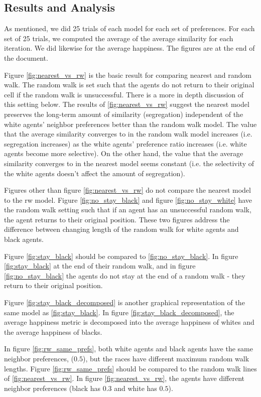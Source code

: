 \documentclass[11pt,twoside]{amsart}
\theoremstyle{theorem}
\theoremstyle{definition}
\theoremstyle{remark}
\begin{document}
\subsection{Results and Analysis}
As mentioned, we did 25 trials of each model for each set of preferences. 
For each set of 25 trials, we computed the average of the average similarity for each iteration. 
We did likewise for the average happiness. 
The figures are at the end of the document.

Figure \ref{fig:nearest_vs_rw} is the basic result for comparing nearest and random walk.
The random walk is set such that the agents do not return to their original cell if the random walk is unsuccessful. 
There is a more in depth discussion of this setting below. 
The results of \ref{fig:nearest_vs_rw} suggest the nearest model preserves the long-term amount of similarity (segregation) independent of the white agents' neighbor preferences better than the random walk model. 
The value that the average similarity converges to in the random walk model increases (i.e. segregation increases) as the white agents' preference ratio increases (i.e. white agents become more selective).
On the other hand, the value that the average similarity converges to in the nearest model seems constant (i.e. the selectivity of the white agents doesn't affect the amount of segregation).

Figures other than figure \ref{fig:nearest_vs_rw} do not compare the nearest model to the rw model. 
Figure \ref{fig:no_stay_black} and figure \ref{fig:no_stay_white} have the random walk setting such that if an agent has an unsuccessful random walk, the agent returns to their original position. 
These two figures address the difference between changing length of the random walk for white agents and black agents. 


Figure \ref{fig:stay_black} should be compared to \ref{fig:no_stay_black}. In figure \ref{fig:stay_black} at the end of their random walk, and in figure \ref{fig:no_stay_black} the agents do not stay at the end of a random walk - they return to their original position.

Figure \ref{fig:stay_black_decomposed} is another graphical representation of the same model as \ref{fig:stay_black}. 
In figure \ref{fig:stay_black_decomposed}, the average happiness metric is decomposed into the average happiness of whites and the average happiness of blacks.

In figure \ref{fig:rw_same_prefs}, both white agents and black agents have the same neighbor preferences, ($0.5$), but the races have different maximum random walk lengths. Figure \ref{fig:rw_same_prefs} should be compared to the random walk lines of \ref{fig:nearest_vs_rw}. In figure \ref{fig:nearest_vs_rw}, the agents have different neighbor preferences (black has $0.3$ and white has $0.5$). 
\end{document}
